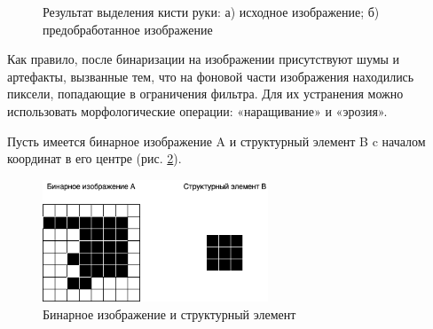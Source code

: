 \begin{figure}[ht!]
	\begin{minipage}[h]{0.49\linewidth}
	\end{minipage}
	\hfill
	\begin{minipage}[h]{0.49\linewidth}
	\end{minipage}
	\caption{Результат выделения кисти руки: а) исходное изображение; б) предобработанное изображение}
	\label{anal:preproc}
\end{figure}

Как правило, после бинаризации на изображении присутствуют шумы и артефакты, вызванные тем, что на фоновой части изображения находились пиксели,
попадающие в ограничения фильтра. Для их устранения можно использовать морфологические операции: «наращивание» и «эрозия»\cite{DIP}.

Пусть имеется бинарное изображение A и структурный элемент B c началом координат в его центре (рис. \ref{an:morph}).

\begin{figure}[!h]
	\centering
	\includegraphics[width=0.6\textwidth]{inc/img/morf}
	\caption{Бинарное изображение и структурный элемент}
	\label{an:morph}
\end{figure}

